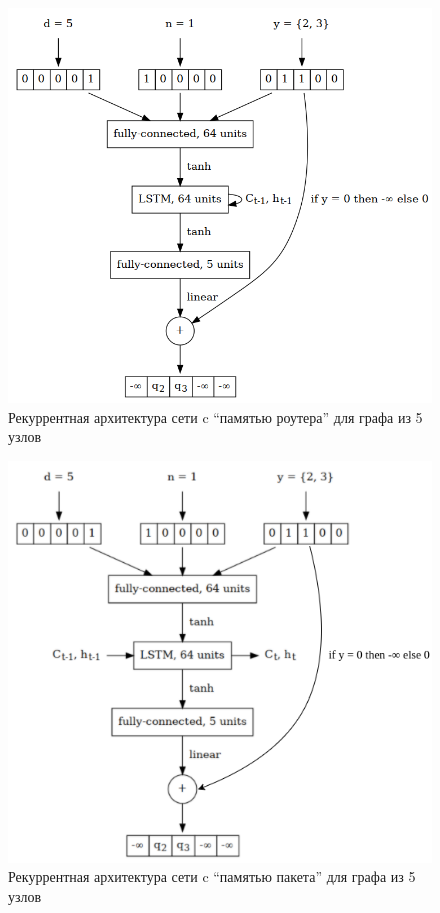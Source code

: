 \documentclass[specification, annotation]{itmo-student-thesis}
\begin{document}
\begin{figure}[!h]
  \caption{Рекуррентная архитектура сети c \enquote{памятью роутера} для графа из 5
    узлов}\label{nn-pic-lstm-1}
  \centering
  \includegraphics[scale=0.5]{nn-3}
\end{figure}

\begin{figure}[!h]
  \caption{Рекуррентная архитектура сети c \enquote{памятью пакета} для графа из 5
    узлов}\label{nn-pic-lstm-2}
  \centering
  \includegraphics[scale=0.7]{nn-4-final}
\end{figure}
\end{document}
